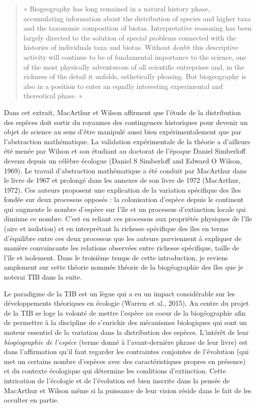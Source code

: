 \begin{quote}
« Biogeography has long remained in a natural history phase,
accumulating information about the distribution of species and higher
taxa and the taxonomic composition of biotas. Interpretative reasoning
has been largely directed to the solution of special problems connected
with the histories of individuals taxa and biotas. Without doubt this
descriptive activity will continue to be of fundamental importance to
the science, one of the most physically adventurous of all scientific
entreprises and, in the richness of the detail it unfolds, esthetically
pleasing. But biogeography is also in a position to enter an equally
interesting experimental and thereotical phase. »
\end{quote}

Dans cet extrait, MacArthur et Wilson affirment que l'étude de la
distribution des espèces doit sortir du royaumes des contingences
historiques pour devenir un objet de science au sens d'être manipulé
aussi bien expérimentalement que par l'abstraction mathématique. La
validation expérimentale de la théorie a d'ailleurs été menée par Wilson
et son étudiant au doctorat de l'époque Daniel Simberloff devenu depuis
un célèbre écologue (Daniel S Simberloff and Edward O Wilson, 1969). Le
travail d'abstraction mathématique a été conduit par MacArthur dans le
livre de 1967 et prolongé dans les annexes de son livre de 1972
(MacArthur, 1972). Ces auteurs proposent une explication de la variation
spécifique des îles fondée sur deux processus opposés : la colonisation
d'espèce depuis le continent qui augmente le nombre d'espèce sur l'île
et un processus d'extinction locale qui diminue ce nombre. C'est en
reliant ces processus aux propriétés physiques de l'île (aire et
isolation) et en interprétant la richesse spécifique des îles en terme
d'équilibre entre ces deux processus que les auteurs parviennent à
expliquer de manière convaincante les relations observées entre richesse
spécifique, taille de l'île et isolement. Dans le troisième temps de
cette introduction, je reviens amplement sur cette théorie nommée
théorie de la biogéographie des îles que je noterai TIB dans la suite.

Le paradigme de la TIB est un lègue qui a eu un impact considérable sur
les développements théoriques en écologie (Warren et al., 2015). Au
centre du projet de la TIB se loge la volonté de mettre l'espèce au
coeur de la biogéographie afin de permettre à la discipline de
s'enrichir des mécanismes biologiques qui sont un moteur essentiel de la
variation dans la distribution des espèces. L'intérêt de leur
\emph{biogéographie de l'espèce} (terme donné à l'avant-dernière phrase
de leur livre) est dans l'affirmation qu'il faut regarder les
contraintes conjointes de l'évolution (qui met un certains nombre
d'espèces avec des caractéristiques propres en présence) et du contexte
écologique qui détermine les conditions d'extinction. Cette intrication
de l'écologie et de l'évolution est bien inscrite dans la pensée de
MacArthur et Wilson même si la puissance de leur vision réside dans le
fait de les occulter en partie.

